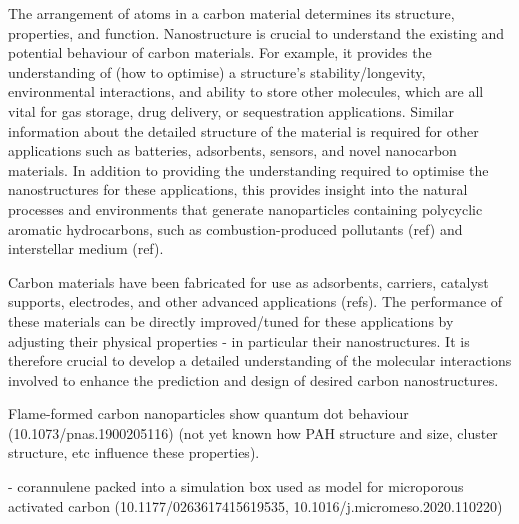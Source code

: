 The arrangement of atoms in a carbon material determines its structure, properties, and function. Nanostructure is crucial to understand the existing and potential behaviour of carbon materials. For example, it provides the understanding of (how to optimise) a structure's stability/longevity, environmental interactions, and ability to store other molecules, which are all vital for gas storage, drug delivery, or sequestration applications.  Similar information about the detailed structure of the material is required for other applications such as batteries, adsorbents, %
sensors, and novel nanocarbon materials.
In addition to providing the understanding required to optimise the nanostructures for these applications, this provides insight into the natural processes and environments that generate nanoparticles containing polycyclic aromatic hydrocarbons, such as combustion-produced pollutants (ref) and interstellar medium (ref).


Carbon materials have been fabricated for use as adsorbents, carriers, catalyst supports, electrodes, and other advanced applications (refs).  The performance of these materials can be directly improved/tuned for these applications by adjusting their physical properties - in particular their nanostructures.  It is therefore crucial to develop a detailed understanding of the molecular interactions involved to enhance the prediction and design of desired carbon nanostructures.

Flame-formed carbon nanoparticles show quantum dot behaviour (10.1073/pnas.1900205116) (not yet known how PAH structure and size, cluster structure, etc influence these properties).

- corannulene packed into a simulation box used as model for microporous activated carbon (10.1177/0263617415619535, 10.1016/j.micromeso.2020.110220) 



